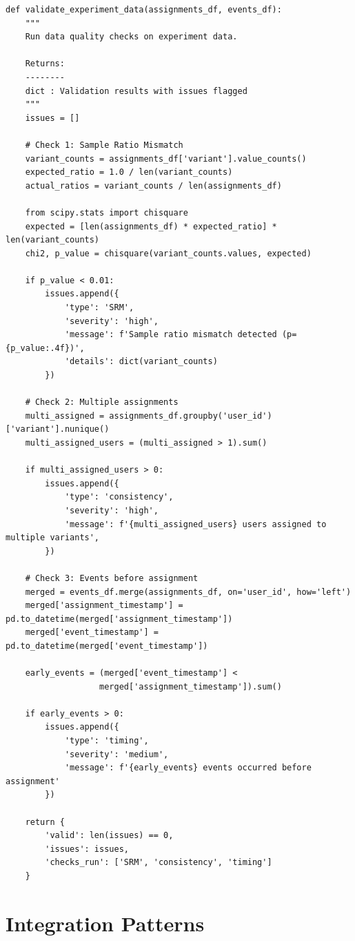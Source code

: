 \lstset{language=Python, caption=Data Quality Validation}
\begin{lstlisting}
def validate_experiment_data(assignments_df, events_df):
    """
    Run data quality checks on experiment data.

    Returns:
    --------
    dict : Validation results with issues flagged
    """
    issues = []

    # Check 1: Sample Ratio Mismatch
    variant_counts = assignments_df['variant'].value_counts()
    expected_ratio = 1.0 / len(variant_counts)
    actual_ratios = variant_counts / len(assignments_df)

    from scipy.stats import chisquare
    expected = [len(assignments_df) * expected_ratio] * len(variant_counts)
    chi2, p_value = chisquare(variant_counts.values, expected)

    if p_value < 0.01:
        issues.append({
            'type': 'SRM',
            'severity': 'high',
            'message': f'Sample ratio mismatch detected (p={p_value:.4f})',
            'details': dict(variant_counts)
        })

    # Check 2: Multiple assignments
    multi_assigned = assignments_df.groupby('user_id')['variant'].nunique()
    multi_assigned_users = (multi_assigned > 1).sum()

    if multi_assigned_users > 0:
        issues.append({
            'type': 'consistency',
            'severity': 'high',
            'message': f'{multi_assigned_users} users assigned to multiple variants',
        })

    # Check 3: Events before assignment
    merged = events_df.merge(assignments_df, on='user_id', how='left')
    merged['assignment_timestamp'] = pd.to_datetime(merged['assignment_timestamp'])
    merged['event_timestamp'] = pd.to_datetime(merged['event_timestamp'])

    early_events = (merged['event_timestamp'] <
                   merged['assignment_timestamp']).sum()

    if early_events > 0:
        issues.append({
            'type': 'timing',
            'severity': 'medium',
            'message': f'{early_events} events occurred before assignment'
        })

    return {
        'valid': len(issues) == 0,
        'issues': issues,
        'checks_run': ['SRM', 'consistency', 'timing']
    }
\end{lstlisting}

\section{Integration Patterns}


